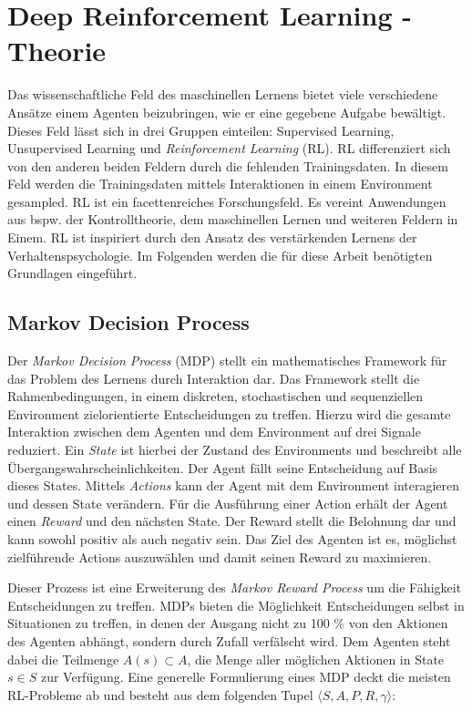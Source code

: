 \section{Deep Reinforcement Learning - Theorie}\label{hauptabschnitt_3}
Das wissenschaftliche Feld des maschinellen Lernens bietet viele verschiedene Ansätze einem Agenten beizubringen, wie er eine gegebene Aufgabe bewältigt. Dieses Feld lässt sich in drei Gruppen einteilen: Supervised Learning, Unsupervised Learning und \emph{Reinforcement Learning} (RL). RL differenziert sich von den anderen beiden Feldern durch die fehlenden Trainingsdaten. In diesem Feld werden die Trainingsdaten mittels Interaktionen in einem Environment gesampled. RL ist ein facettenreiches Forschungsfeld. Es vereint Anwendungen aus bspw. der Kontrolltheorie, dem maschinellen Lernen und weiteren Feldern in Einem. RL ist inspiriert durch den Ansatz des verstärkenden Lernens der Verhaltenspsychologie. Im Folgenden werden die für diese Arbeit benötigten Grundlagen eingeführt.


\subsection{Markov Decision Process}\label{absch_RL_mdp}
Der \emph{Markov Decision Process} (MDP) \cite{mdp_bellman} stellt ein mathematisches Framework für das Problem des Lernens durch Interaktion dar. 
Das Framework stellt die Rahmenbedingungen, in einem diskreten, stochastischen und sequenziellen Environment zielorientierte Entscheidungen zu treffen. Hierzu wird die gesamte Interaktion zwischen dem Agenten und dem Environment auf drei Signale reduziert. Ein \emph{State} ist hierbei der Zustand des Environments und beschreibt alle Übergangswahrscheinlichkeiten. Der Agent fällt seine Entscheidung auf Basis dieses States. Mittels \emph{Actions} kann der Agent mit dem Environment interagieren und dessen State verändern. Für die Ausführung einer Action erhält der Agent einen \emph{Reward} und den nächsten State. Der Reward stellt die Belohnung dar und kann sowohl positiv als auch negativ sein. Das Ziel des Agenten ist es, möglichst zielführende Actions auszuwählen und damit seinen Reward zu maximieren.

Dieser Prozess ist eine Erweiterung des \emph{Markov Reward Process} um die Fähigkeit Entscheidungen zu treffen. MDPs bieten die Möglichkeit Entscheidungen selbst in Situationen zu treffen, in denen der Ausgang nicht zu 100 \% von den Aktionen des Agenten abhängt, sondern durch Zufall verfälscht wird. Dem Agenten steht dabei die Teilmenge $A(s) \subset A $, die Menge aller möglichen Aktionen in State $s \in S$ zur Verfügung. Eine generelle Formulierung eines MDP deckt die meisten RL-Probleme ab und besteht aus dem folgenden Tupel $\langle S, A, P, R, \gamma \rangle$: 

